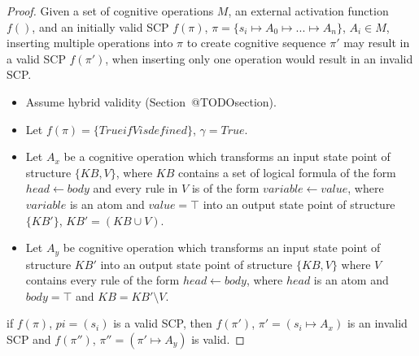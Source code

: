 \begin{proof} \label{proof:insertionSearch}
Given a set of cognitive operations $M$, an external activation function $f()$, and an initially valid SCP $f(\pi)$, $\pi=\{s_i \longmapsto A_0 \longmapsto ... \longmapsto A_n\}$, $A_i \in M$, inserting multiple operations into $\pi$ to create cognitive sequence $\pi'$ may result in a valid SCP $f(\pi')$, when inserting only one operation would result in an invalid SCP.

\begin{itemize}
\item Assume hybrid validity (Section~@TODOsection).
\item Let $f(\pi)=\{True if V is defined\}$, $\gamma = True$.
\item Let $A_x$ be a cognitive operation which transforms an input state point of structure $\{KB, V\}$, where $KB$ contains a set of logical formula of the form $head \leftarrow body$ and every rule in $V$ is of the form $variable \leftarrow value$, where $variable$ is an atom and  $value=\top$ into an output state point of structure $\{KB'\}$, $KB'=(KB \cup V)$.
\item Let $A_y$ be cognitive operation which transforms an input state point of structure $KB'$ into an output state point of structure $\{KB, V\}$ where $V$ contains every rule of the form $head \leftarrow body$, where $head$ is an atom and $body=\top$ and $KB= KB' \setminus V$.
\end{itemize}
\item if $f(\pi)$, $pi=(s_i)$ is a valid SCP, then $f(\pi')$, $\pi'=(s_i\longmapsto A_x)$ is an invalid SCP and $f(\pi'')$, $\pi''=(\pi'\longmapsto A_y)$ is valid.
\end{proof}












